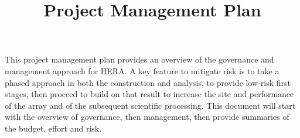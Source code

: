 \documentclass[preprint]{aastex}
\begin{document}
\title{Project Management Plan}


This project management plan provides an overview of the governance and management approach for HERA.
A key feature to mitigate risk is to take a phased approach in both the construction and analysis, to provide low-risk
first stages, then proceed to build on that result to increase the site and performance of the array and of the subsequent
scientific processing.  This document will start with the overview of governance, then management, then provide
summaries of the budget, effort and risk.
\end{document}
